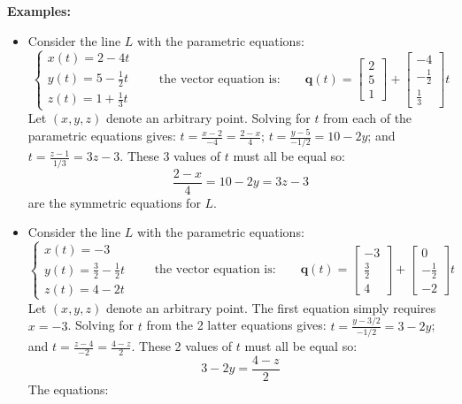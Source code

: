 \documentclass{article}
\begin{document}
\textbf{Examples:}
\begin{itemize}
\item Consider the line \(L\) with the parametric equations: 
\[\left\{\begin{array}{c}
x(t) = 2 - 4t \\ 
y(t) = 5 - \frac{1}{2}t \\ 
z(t) = 1 + \frac{1}{3}t
\end{array}\right.
\quad\quad\text{the vector equation is:}\quad\quad
\mathbf{q}(t) = \begin{bmatrix} 2 \\ 5 \\ 1 \end{bmatrix} + \begin{bmatrix} -4 \\ -\frac{1}{2} \\ \frac{1}{3} \end{bmatrix}t\]
Let \((x, y, z)\) denote an arbitrary point. Solving for \(t\) from each of the parametric equations gives: \(t = \frac{x - 2}{-4} = \frac{2 - x}{4}\); \(t = \frac{y - 5}{-1/2} = 10 - 2y\); and \(t = \frac{z - 1}{1/3} = 3z - 3\). These 3 values of \(t\) must all be equal so:
\[\frac{2 - x}{4} = 10 - 2y = 3z - 3\]
are the symmetric equations for \(L\).
\item Consider the line \(L\) with the parametric equations: 
\[\left\{\begin{array}{c}
x(t) = -3 \\ 
y(t) = \frac{3}{2} - \frac{1}{2}t \\ 
z(t) = 4 - 2t
\end{array}\right.
\quad\quad\text{the vector equation is:}\quad\quad
\mathbf{q}(t) = \begin{bmatrix} -3 \\ \frac{3}{2} \\ 4 \end{bmatrix} + \begin{bmatrix} 0 \\ -\frac{1}{2} \\ -2 \end{bmatrix}t\]
Let \((x, y, z)\) denote an arbitrary point. The first equation simply requires \(x = -3\). Solving for \(t\) from the 2 latter equations gives: \(t = \frac{y - 3/2}{-1/2} = 3 - 2y\); and \(t = \frac{z - 4}{-2} = \frac{4 - z}{2}\). These 2 values of \(t\) must all be equal so:
\[3 - 2y = \frac{4 - z}{2}\]
The equations:

\end{itemize}
\end{document}
